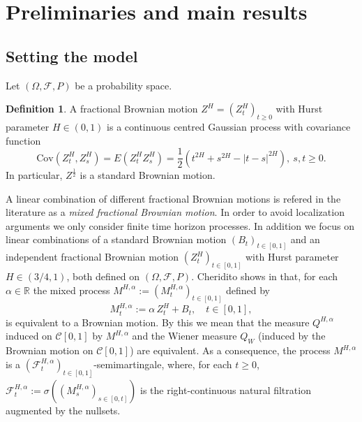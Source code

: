 \documentclass[reqno,a4paper]{amsart}
\theoremstyle{plain}
\theoremstyle{definition}
\newtheorem{definition}{Definition}
\theoremstyle{plain}
\theoremstyle{plain}
\theoremstyle{plain}
\begin{document}
\section{Preliminaries and main results}\label{S1}

\subsection{Setting the model}\label{S1.1}
Let $(\Omega, {{\mathcal F}}, P)$ be a probability space.

\begin{definition}
A fractional Brownian motion $Z^H=(Z^H_t)_{t\geq0}$ with Hurst parameter $H\in(0,1)$ is a continuous centred Gaussian process with covariance function
$$\mathrm{Cov}(Z^H_t,Z^H_s)=E(Z^H_tZ^H_s)=\frac12\left(t^{2H}+s^{2H}-|t-s|^{2H}\right),\ s,t\geq0.$$
In particular, $Z^{\frac12}$ is a standard Brownian motion.
\end{definition}
A linear combination of different fractional Brownian motions is refered in the literature as a \textit{mixed fractional Brownian motion}. In order to avoid localization arguments we only consider finite time horizon processes. In addition we focus on linear combinations of a standard Brownian motion $(B_t)_{t\in[0,1]}$ and an independent fractional Brownian motion $(Z_t^H)_{t\in[0,1]}$ with Hurst parameter $H\in(3/4,1)$, both defined on $(\Omega, {{\mathcal F}}, P)$. Cheridito shows in \cite{Ch,Ch1} that, for each $\alpha\in{{\mathbb R}}$ the mixed process $M^{H,\alpha}:=(M_t^{H,\alpha})_{t\in[0,1]}$ defined by $$M_t^{H,\alpha}:=\alpha\, Z_t^H+ B_t,\quad t\in[0,1],$$
is equivalent to a Brownian motion. By this we mean that the measure $Q^{H,\alpha}$ induced on ${{\mathcal C}}[0,1]$ by $M^{H,\alpha}$ and the Wiener measure $Q_W$ (induced by the Brownian motion on ${{\mathcal C}}[0,1]$) are equivalent. As a consequence, the process $M^{H,\alpha}$ is a $({{\mathcal F}}_t^{H,\alpha})_{t\in[0,1]}$-semimartingale, where, for each $t\geq 0$, ${{\mathcal F}}_t^{H,\alpha}:=\overline{\sigma((M_s^{H,\alpha})_{s\in[0,t]})}$ is the right-continuous natural filtration augmented by the nullsets.
\end{document}
